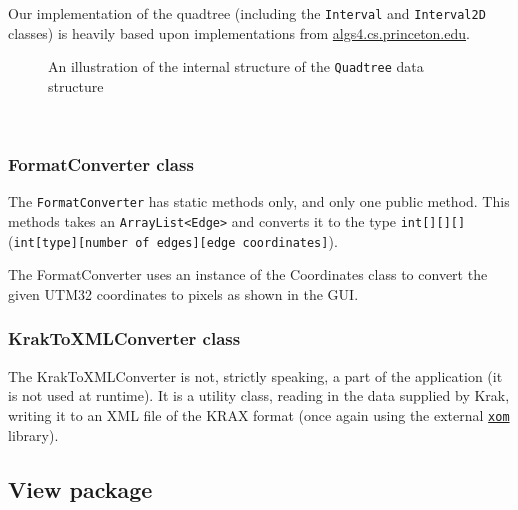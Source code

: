\documentclass[a4paper,11pt]{article}
\begin{document}
Our implementation of the quadtree (including the \texttt{Interval} and \texttt{Interval2D} classes) is heavily based upon implementations from \url{algs4.cs.princeton.edu}.
\\
\begin{figure}[!h]
\centering
{}
	\caption{An illustration of the internal structure of the \texttt{Quadtree} data structure}
\end{figure}
\\
\subsubsection{FormatConverter class} %
The \texttt{FormatConverter} has static methods only, and only one public method. This methods takes an \texttt{ArrayList<Edge>} and converts it to the type \texttt{int[][][]} \\(\texttt{int[type][number of edges][edge coordinates]}).

The FormatConverter uses an instance of the Coordinates class to convert the given UTM32 coordinates to pixels as shown in the GUI.

\subsubsection{KrakToXMLConverter class} %
The KrakToXMLConverter is not, strictly speaking, a part of the application (it is not used at runtime). It is a utility class, reading in the data supplied by Krak, writing it to an XML file of the KRAX format (once again using the external \href{www.xom.nu}{\texttt{xom}} library).

\subsection{View package} %
\end{document}

